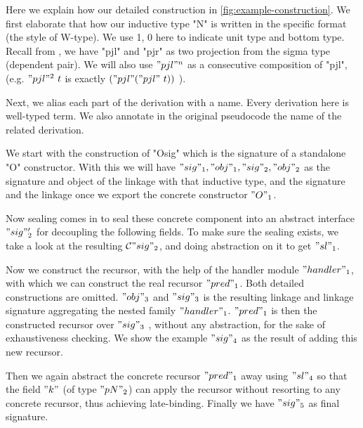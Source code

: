 Here we explain how  our detailed construction in
\cref{fig:example-construction}. We first elaborate that
how our inductive type "N" is written in the specific format (the style
of W-type). We use 1, 0 here to indicate unit type and bottom type. Recall from , we have "pjl" and "pjr" as two projection from the sigma type (dependent pair). We will also use $"pjl"^n$ as a consecutive composition of "pjl", (e.g. $"pjl"^2~t$ is exactly $("pjl" ("pjl"~t))$ ).

Next, we alias each part of the derivation with a name. Every derivation
here is well-typed term. We also annotate in the original pseudocode the
name of the related derivation. 

We start with the construction of "Osig" which is the signature of a
standalone "O" constructor. With this we will have $"sig"_1, "obj"_1,
"sig"_2, "obj"_2$ as the signature and object of the linkage with that
inductive type, and the signature and the linkage once we export the
concrete constructor $"O"_1$. 

Now sealing comes in to seal these concrete component into an abstract
interface $"sig"_2'$ for decoupling the following fields. To make sure
the sealing exists, we take a look at the resulting ${\mathcal{C}} "sig"_2$, and
doing abstraction on it to get $"sl"_1$. 

Now we construct the recursor, with the help of the handler module
$"handler"_1$, with which we can construct the real recursor $"pred"_1$.
Both detailed constructions are omitted. $"obj"_3$ and $"sig"_3$ is the resulting linkage and linkage signature aggregating the nested family $"handler"_1$. $"pred"_1$ is then the constructed recursor over $"sig"_3$ , without any abstraction, for the sake of exhaustiveness checking. We show the example $"sig"_4$ as the result of adding this new recursor. 

Then we again abstract the concrete recursor $"pred"_1$ away using $"sl"_4$ so that the field $"k"$ (of type $"pN"_2$)
can apply the recursor without resorting to any concrete recursor, thus achieving late-binding. Finally we
have $"sig"_5$ as final signature. 


